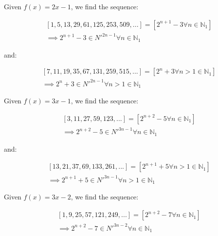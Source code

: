 \documentclass{article}
\begin{document}
\noindent
Given \begin{math}f(x)=2x-1\end{math}, we find the sequence:

\begin{displaymath}\begin{aligned}
& [1, 5, 13, 29, 61, 125, 253, 509, ...] = [2^{n+1}-3 \forall n \in \mathbb{N}_{1}] \\
& \implies 2^{n+1}-3 \in N'^{2n-1} \forall n \in \mathbb{N}_{1}
\end{aligned}\end{displaymath}

\noindent
and:

\begin{displaymath}\begin{aligned}
& [7, 11, 19, 35, 67, 131, 259, 515, ...] = [2^n+3 \forall n>1 \in \mathbb{N}_{1}] \\
& \implies 2^n+3 \in N'^{2n-1} \forall n>1 \in \mathbb{N}_{1}
\end{aligned}\end{displaymath}

\noindent
Given \begin{math}f(x)=3x-1\end{math}, we find the sequence:

\begin{displaymath}\begin{aligned}
& [3, 11, 27, 59, 123, ...] = [2^{n+2}-5 \forall n \in \mathbb{N}_{1}] \\
& \implies 2^{n+2}-5 \in N'^{3n-1} \forall n \in \mathbb{N}_{1}
\end{aligned}\end{displaymath}

\noindent
and:

\begin{displaymath}\begin{aligned}
& [13, 21, 37, 69, 133, 261, ...] = [2^{n+1}+5 \forall n>1 \in \mathbb{N}_{1}] \\
& \implies 2^{n+1}+5 \in N'^{3n-1} \forall n>1 \in \mathbb{N}_{1}
\end{aligned}\end{displaymath}

\noindent
Given \begin{math}f(x)=3x-2\end{math}, we find the sequence:

\begin{displaymath}\begin{aligned}
& [1, 9, 25, 57, 121, 249, ...] = [2^{n+2}-7 \forall n \in \mathbb{N}_{1}] \\
& \implies 2^{n+2}-7 \in N'^{3n-2} \forall n \in \mathbb{N}_{1}
\end{aligned}\end{displaymath}
\end{document}
